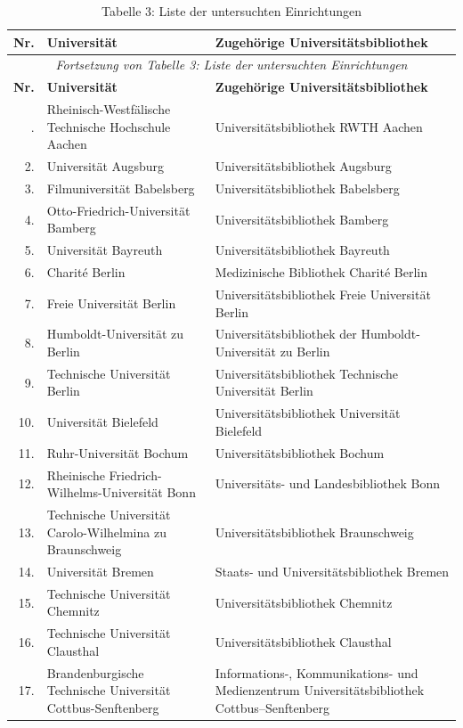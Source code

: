 \documentclass[a4paper,
fontsize=11pt,
oneside,
numbers=noperiodatend,
parskip=half-,
bibliography=totoc,
final
]{scrartcl}
\begin{document}
\begin{longtable}[l]{rp{7cm}p{7.5cm}}
\caption{Tabelle 3: Liste der untersuchten Einrichtungen} \\
\toprule
\textbf{Nr.} & \textbf{Universität} & \textbf{Zugehörige Universitätsbibliothek} \\
\midrule
\endfirsthead
\multicolumn{3}{c}{\textit{Fortsetzung von Tabelle 3: Liste der untersuchten Einrichtungen}}\\
\toprule
\textbf{Nr.} & \textbf{Universität} & \textbf{Zugehörige Universitätsbibliothek} \\
\midrule
\endhead
\bottomrule
\endfoot
\bottomrule
 \endlastfoot
1. & Rheinisch-Westfälische Technische Hochschule Aachen & Universitätsbibliothek RWTH Aachen \\
2. & Universität Augsburg & Universitätsbibliothek Augsburg \\ 
3. & Filmuniversität Babelsberg & Universitätsbibliothek Babelsberg \\
4. & Otto-Friedrich-Universität Bamberg & Universitätsbibliothek Bamberg \\
5. & Universität Bayreuth & Universitätsbibliothek Bayreuth \\
6. & Charité Berlin & Medizinische Bibliothek Charité Berlin \\
7. & Freie Universität Berlin & Universitätsbibliothek Freie Universität Berlin \\
8. & Humboldt-Universität zu Berlin & Universitätsbibliothek der Humboldt-Universität zu Berlin \\
9. & Technische Universität Berlin & Universitätsbibliothek Technische Universität Berlin \\
10. & Universität Bielefeld & Universitätsbibliothek Universität Bielefeld \\
11. & Ruhr-Universität Bochum & Universitätsbibliothek Bochum \\
12. & Rheinische Friedrich-Wilhelms-Universität Bonn & Universitäts- und Landesbibliothek Bonn \\
13. & Technische Universität Carolo-Wilhelmina zu Braunschweig & Universitätsbibliothek Braunschweig \\
14. & Universität Bremen & Staats- und Universitätsbibliothek Bremen \\
15. & Technische Universität Chemnitz & Universitätsbibliothek Chemnitz \\
16. & Technische Universität Clausthal & Universitätsbibliothek Clausthal \\
17. & Brandenburgische Technische Universität Cottbus-Senftenberg & Informations-, Kommunikations- und Medienzentrum Universitätsbibliothek Cottbus--Senftenberg \\

\end{longtable}
\end{document}
